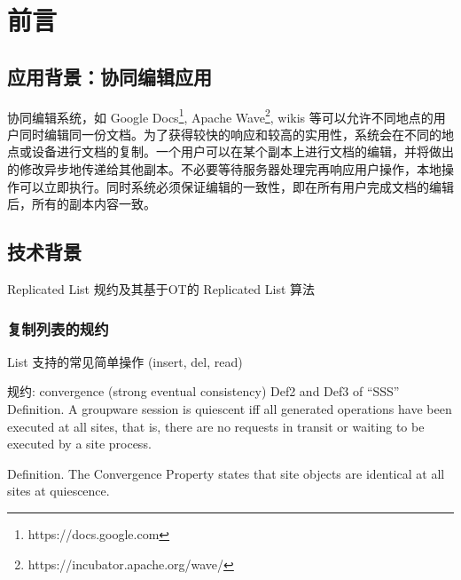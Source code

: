 \chapter{前言}
\section{应用背景：协同编辑应用}
	\par 协同编辑系统，如 Google Docs\footnote{https://docs.google.com}, Apache Wave\footnote{https://incubator.apache.org/wave/}, wikis \cite{citeulike:1087263} 等可以允许不同地点的用户同时编辑同一份文档。为了获得较快的响应和较高的实用性，系统会在不同的地点或设备进行文档的复制。一个用户可以在某个副本上进行文档的编辑，并将做出的修改异步地传递给其他副本。不必要等待服务器处理完再响应用户操作，本地操作可以立即执行。同时系统必须保证编辑的一致性，即在所有用户完成文档的编辑后，所有的副本内容一致。

\section{技术背景}

Replicated List 规约及其基于OT的 Replicated List 算法

\subsection{复制列表的规约}
List 支持的常见简单操作 (insert, del, read)

规约: convergence (strong eventual consistency)
Def2 and Def3 of ``SSS''
Definition. A groupware session is quiescent iff all generated
operations have been executed at all sites, that is, there
are no requests in transit or waiting to be executed by a
site process.\cite{ellis1989concurrency}

Definition. The Convergence Property states that site objects
are identical at all sites at quiescence.\cite{ellis1989concurrency}

